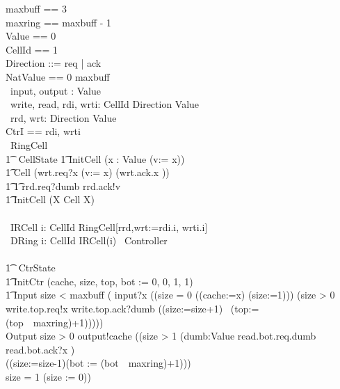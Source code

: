 \documentclass[10pt]{article}
\begin{document}
\begin{circus}

maxbuff == 3 \\
maxring == maxbuff - 1 \\
Value == 0  \\
CellId == 1  \\
Direction ::=  req | ack\\
NatValue == 0 \upto maxbuff\\
\also \circchannel\ input, output : Value \\
\circchannel\ write, read, rdi, wrti: CellId \cross Direction \cross Value \\
\circchannel\ rrd, wrt: Direction \cross Value \\
\circchannelset CtrI == \lchanset rdi, wrti \rchanset \\

\circprocess\ RingCell \circdef\\
\circbegin
\t1 \circstate\ CellState 
\t1 InitCell \circdef (\Intchoice x : Value \circspot (v:= x)) \\
\t1 Cell \circdef (wrt.req?x \then (v:= x) \circseq (wrt.ack.x \then \Skip))  \\
\t1 \t1         \extchoice rrd.req?dumb \then rrd.ack!v \then \Skip \\
\t1 \circspot InitCell \circseq (\circmu X \circspot Cell \circseq X)
\\
\circend
\\
\circprocess\ IRCell \circdef i: CellId \circspot RingCell[rrd,wrt:=rdi.i, wrti.i]
\\
\circprocess\ DRing \circdef \Interleave i: CellId \circspot IRCell(i)
\also
\circprocess\ Controller \circdef \\
\circbegin\\
\t1 \circstate\ CtrState  \\

\t1 InitCtr \circdef (cache, size, top, bot := 0, 0, 1, 1) \\
\t1 Input \circdef  
	\lcircguard size < maxbuff \rcircguard 
		\circguard (
        input?x \then 
        ((\lcircguard size = 0 \rcircguard
                  \circguard ((cache:=x) \circseq (size:=1)))
                \extchoice 
                (\lcircguard size > 0 \rcircguard 
                  \circguard 
                    write.top.req!x \then
                    write.top.ack?dumb \then 
                    ((size:=size+1) \circseq\ 
                    (top:=(top~\mod~maxring)+1)))))
    \\
 Output \circdef
\lcircguard size > 0 \rcircguard 
\circguard 
    output!cache \then
    ((\lcircguard size > 1 \rcircguard \circguard 
          (\Intchoice dumb:Value \circspot read.bot.req.dumb \then read.bot.ack?x \then \Skip) \circseq \\
          ((size:=size-1)\circseq (bot := (bot~\mod~maxring)+1)))\\
      \extchoice \lcircguard size = 1 \rcircguard \circguard (size := 0)) \\


\end{circus}
\end{document}
